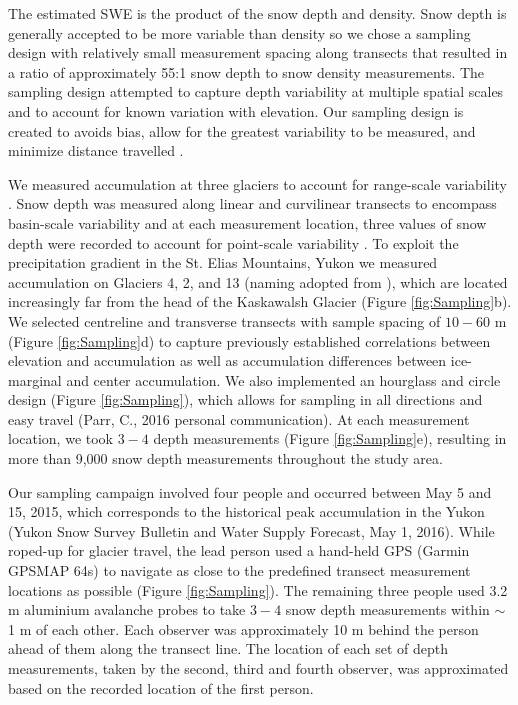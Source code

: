 \documentclass[twocolumn,letterpaper]{igs}
\begin{document}
The estimated SWE is the product of the snow depth and density. Snow depth is generally accepted to be more variable than density \citep{Elder1991, Clark2011, Lopez2013} so we chose a sampling design with relatively small measurement spacing along transects that resulted in a ratio of approximately 55:1 snow depth to snow density measurements. The sampling design attempted to capture depth variability at multiple spatial scales and to account for known variation with elevation. Our sampling design is created to avoids bias, allow for the greatest variability to be measured, and minimize distance travelled \citep{Shea2010}.

We measured accumulation at three glaciers to account for range-scale variability \citep{Clark2011}. Snow depth was measured along linear and curvilinear transects to encompass basin-scale variability and at each measurement location, three values of snow depth were recorded to account for point-scale variability \citep{Clark2011}. To exploit the precipitation gradient in the St. Elias Mountains, Yukon \citep{Taylor1969} we measured accumulation on Glaciers 4, 2, and 13 (naming adopted from \cite{Crompton2016}), which are located increasingly far from the head of the Kaskawalsh Glacier (Figure \ref{fig:Sampling}b). We selected centreline and transverse transects with sample spacing of $10-60$ m (Figure \ref{fig:Sampling}d) to capture previously established correlations between elevation and accumulation \citep{Machguth2006, Walmsley2015} as well as accumulation differences between ice-marginal and center accumulation. We also implemented an hourglass and circle design (Figure \ref{fig:Sampling}), which allows for sampling in all directions and easy travel (Parr, C., 2016 personal communication). At each measurement location, we took $3-4$ depth measurements (Figure \ref{fig:Sampling}e), resulting in more than 9,000 snow depth measurements throughout the study area. 

Our sampling campaign involved four people and occurred between May 5 and 15, 2015, which corresponds to the historical peak accumulation in the Yukon (Yukon Snow Survey Bulletin and Water Supply Forecast, May 1, 2016). While roped-up for glacier travel, the lead person used a hand-held GPS (Garmin GPSMAP 64s) to navigate as close to the predefined transect measurement locations as possible (Figure \ref{fig:Sampling}). The remaining three people used 3.2 m aluminium avalanche probes to take $3-4$ snow depth measurements within $\sim$1 m of each other. Each observer was approximately 10 m behind the person ahead of them along the transect line. The location of each set of depth measurements, taken by the second, third and fourth observer, was approximated based on the recorded location of the first person. 
\end{document}
